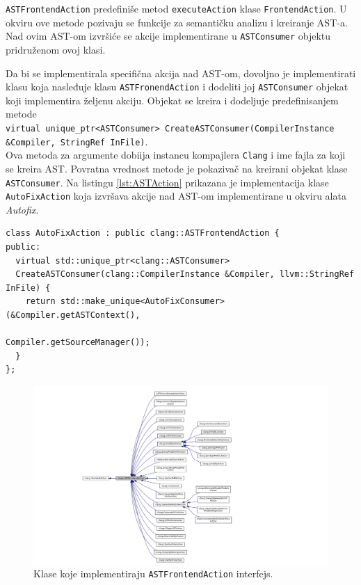 \documentclass[12pt,oneside]{memoir}
\begin{document}
\texttt{ASTFrontendAction} predefini\v{s}e metod \texttt{executeAction} klase \texttt{FrontendAction}. U okviru ove metode pozivaju se funkcije za semanti\v{c}ku analizu i kreiranje AST-a. Nad ovim AST-om izvr\v{s}i\'{c}e se akcije implementirane u \texttt{ASTConsumer} objektu pridru\v{z}enom ovoj klasi.

Da bi se implementirala specifi\v{c}na akcija nad AST-om, dovoljno je implementirati klasu koja nasleđuje klasu \texttt{ASTFronendAction} i dodeliti joj \texttt{ASTConsumer} objekat koji implementira \v{z}eljenu akciju. Objekat se kreira i dodeljuje predefinisanjem metode \\ \lstinline[style=customc]{virtual unique_ptr<ASTConsumer> CreateASTConsumer(CompilerInstance &Compiler, StringRef InFile)}. \\
Ova metoda za argumente dobiija instancu kompajlera \texttt{Clang} i ime fajla za koji se kreira AST. Povratna vrednost metode je pokaziva\v{c} na kreirani objekat klase \texttt{ASTConsumer}.
Na listingu \ref{lst:ASTAction} prikazana je implementacija klase \texttt{AutoFixAction} koja izvr\v{s}ava akcije nad AST-om implementirane u okviru alata \textit{Autofix}.

\begin{lstlisting}[style=customc, basicstyle=\tiny, caption={Implementacija klase AutoFixAction kori\v{s}\'{c}ene u okviru alata \textit{Autofix}.}, label=lst:ASTAction]
class AutoFixAction : public clang::ASTFrontendAction {
public:
  virtual std::unique_ptr<clang::ASTConsumer>
  CreateASTConsumer(clang::CompilerInstance &Compiler, llvm::StringRef InFile) {
    return std::make_unique<AutoFixConsumer>(&Compiler.getASTContext(),
                                             Compiler.getSourceManager());
  }
};
\end{lstlisting}


\begin{figure}[h!]
\begin{center}
\includegraphics[scale=0.4]{ASTFrontendAction.png}
\end{center}
\caption{Klase koje implementiraju \texttt{ASTFrontendAction} interfejs.}
\label{fig:ASTAction}
\end{figure}
\end{document}
